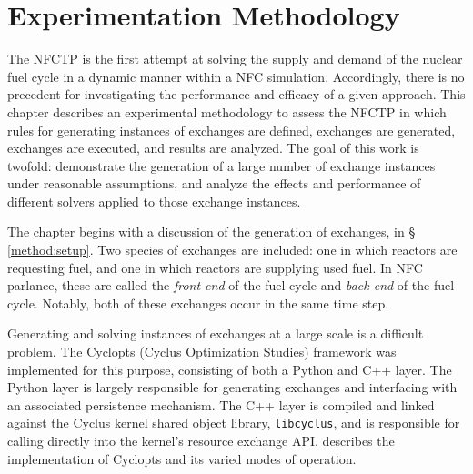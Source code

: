 \chapter{Experimentation Methodology}\label{ch:method}

The NFCTP is the first attempt at solving the supply and demand of the nuclear
fuel cycle in a dynamic manner within a NFC simulation. Accordingly, there is no
precedent for investigating the performance and efficacy of a given
approach. This chapter describes an experimental methodology to assess the NFCTP
in which rules for generating instances of exchanges are defined, exchanges are
generated, exchanges are executed, and results are analyzed. The goal of this
work is twofold: demonstrate the generation of a large number of exchange
instances under reasonable assumptions, and analyze the effects and performance
of different solvers applied to those exchange instances.

The chapter begins with a discussion of the generation of exchanges, in \S
\ref{method:setup}. Two species of exchanges are included: one in which reactors
are requesting fuel, and one in which reactors are supplying used fuel. In NFC
parlance, these are called the \textit{front end} of the fuel cycle and
\textit{back end} of the fuel cycle. Notably, both of these exchanges occur
in the same time step. 

Generating and solving instances of exchanges at a large scale is a difficult
problem. The Cyclopts (\underline{Cycl}us \underline{Opt}imization
\underline{S}tudies) framework was implemented for this purpose, consisting of
both a Python and C++ layer. The Python layer is largely responsible for
generating exchanges and interfacing with an associated persistence
mechanism. The C++ layer is compiled and linked against the Cyclus kernel shared
object library, \texttt{libcyclus}, and is responsible for calling directly into
the kernel's resource exchange API.  describes the
implementation of Cyclopts and its varied modes of operation.




